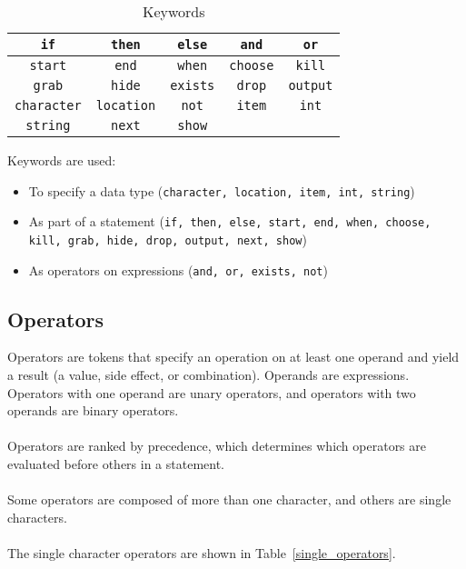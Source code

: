 \documentclass[12pt]{article}
\begin{document}
\begin{table}[htdp]
\caption{Keywords}
\begin{center}
\begin{tabular}{|c|c|c|c|c|}
\hline
\texttt{if} & \texttt{then} & \texttt{else} & \texttt{and} & \texttt{or} \\
\hline
\texttt{start} & \texttt{end} & \texttt{when} & \texttt{choose} & \texttt{kill} \\
\hline
\texttt{grab} & \texttt{hide} & \texttt{exists} & \texttt{drop} & \texttt{output} \\
\hline
\texttt{character} & \texttt{location} & \texttt{not} & \texttt{item} & \texttt{int} \\
\hline
\texttt{string} & \texttt{next} & \texttt{show} & &  \\
\hline
\end{tabular}
\end{center}
\label{keywords}
\end{table}

\noindent Keywords are used:
\begin{itemize}
\item To specify a data type (\texttt{character, location, item, int, string})
\item As part of a statement (\texttt{if, then, else, start, end, when, choose, kill, grab, hide, drop, output, next, show}) 
\item As operators on expressions (\texttt{and, or, exists, not})
\end{itemize}

\subsection{Operators}
Operators are tokens that specify an operation on at least one operand and yield a result (a value, side effect, or combination).  Operands are expressions.  Operators with one operand are unary operators, and operators with two operands are binary operators.
\\
\\
\noindent Operators are ranked by precedence, which determines which operators are evaluated before others in a statement.
\\
\\
\noindent Some operators are composed of more than one character, and others are single characters.
\\
\\
\noindent The single character operators are shown in Table~\ref{single_operators}.
\end{document}

